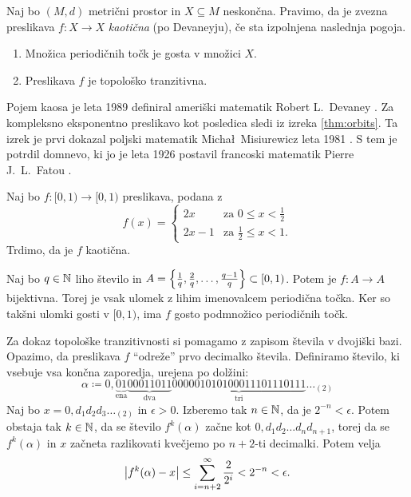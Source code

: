 \begin{definicija}
    Naj bo \((M, d)\) metrični prostor in \(X \subseteq M\) neskončna. Pravimo, da je zvezna preslikava \(f \colon X \to X\) \emph{kaotična} (po Devaneyju), če sta izpolnjena naslednja pogoja.
    \begin{enumerate}
        \item Množica periodičnih točk je gosta v množici \(X\).
        \item Preslikava \(f\) je topološko tranzitivna.
    \end{enumerate}
\end{definicija}

\noindent Pojem kaosa je leta \num{1989} definiral ameriški matematik Robert L.~Devaney \cite{Devaney_1986}. Za kompleksno eksponentno preslikavo kot posledica sledi iz izreka  \ref{thm:orbits}. Ta izrek je prvi dokazal poljski matematik Micha\l\ Misiurewicz leta \num{1981} \cite{Misiurewicz_1981}. S tem je potrdil domnevo, ki jo je leta \num{1926} postavil francoski matematik Pierre J.~L.~Fatou \cite{Fatou_1926}.

\begin{zgled}
    Naj bo \(f \colon [0, 1) \to [0, 1)\) preslikava, podana z
    \[
        f (x) =
        \begin{cases}
            2x & \text{za } 0 \leq x < \frac{1}{2}\\
            2x - 1 & \text{za } \frac{1}{2} \leq x < 1.
        \end{cases}
    \]
    Trdimo, da je \(f\) kaotična.

    Naj bo \(q \in \mathbb N\) liho število in \(A = \left\{ \frac{1}{q}, \frac{2}{q}, \dots, \frac{q - 1}{q} \right\} \subset [0, 1)\). Potem je \(f \colon A \to A\) bijektivna. Torej je vsak ulomek z lihim imenovalcem periodična točka. Ker so takšni ulomki gosti v \([0, 1)\), ima \(f\) gosto podmnožico periodičnih točk.

    Za dokaz topološke tranzitivnosti si pomagamo z zapisom števila v dvojiški bazi. Opazimo, da preslikava \(f\) ``odreže'' prvo decimalko števila. Definiramo število, ki vsebuje vsa končna zaporedja, urejena po dolžini:
    \[\alpha \coloneq 0, \underbrace{0 1}_{\text{ena}} \underbrace{00011011}_{\text{dva}} \underbrace{000 001 010 100 011 101 110 111}_{\text{tri}} \dots_{(2)}\]
    Naj bo \(x = 0, d_1 d_2 d_3 \dots_{(2)}\) in \(\epsilon > 0\). Izberemo tak \(n \in \mathbb N\), da je \(2^{- n} < \epsilon\). Potem obstaja tak \(k \in \mathbb N\), da se število \(f^k (\alpha)\) začne kot \(0, d_1 d_2 \dots d_n d_{n + 1}\), torej da se \(f^k (\alpha)\) in \(x\) začneta razlikovati kvečjemo po \(n + 2\)-ti decimalki. Potem velja
    \[\left\lvert f^k (\alpha) - x\right\rvert \leq \sum_{i = n + 2}^{\infty} \frac{2}{2^{i}} < 2^{- n} < \epsilon.\]
\end{zgled}